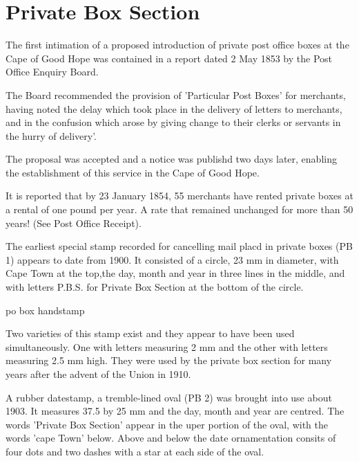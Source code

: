 \section{Private Box Section}




The first intimation of a proposed introduction of private post office boxes at the Cape of Good Hope was contained in a report dated 2 May 1853 by the Post Office Enquiry Board.

The Board recommended the provision of 'Particular Post Boxes' for merchants, having noted the delay which took place in the delivery of letters to merchants, and in the confusion which arose by giving change to their clerks or servants in the hurry of delivery'.

The proposal was accepted and a notice was publishd two days later, enabling the establishment of this service in the Cape of Good Hope.

It is reported that by 23 January 1854, 55 merchants have rented private boxes at a rental of one pound per year. A rate that remained unchanged for more than 50 years! (See Post Office Receipt).

The earliest special stamp recorded for cancelling mail placd in private boxes (PB 1) appears to date from 1900. It consisted of a circle, 23 mm in diameter, with Cape Town at the top,the day, month and year in three lines in the middle, and with letters P.B.S. for Private Box Section at the bottom of the circle.
 
po box handstamp



Two varieties of this stamp exist and they appear to have been used 
simultaneously. One with letters measuring 2 mm and the other 
with letters measuring 2.5 mm high. They were used by the private
box section for many years after the advent of the Union in 1910.

A rubber datestamp, a tremble-lined oval (PB 2) was brought into 
use about 1903. It measures 37.5 by 25 mm and the day, month and year 
are centred. The words 'Private Box Section' appear in the uper portion of the oval, with the words 'cape Town' below. Above and below the date ornamentation consits of four dots and two dashes with a star at each side of the oval.

 
 

